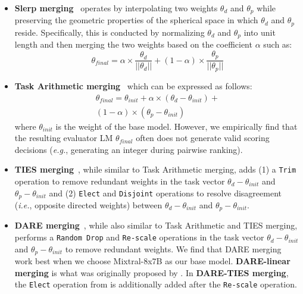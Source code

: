 \documentclass[11pt]{article}
\begin{document}
\begin{itemize}
    \item \textbf{Slerp merging}~\citep{goddard2024arcee} operates by interpolating two weights ${\theta}_{d}$ and ${\theta}_{p}$ while preserving the geometric properties of the spherical space in which ${\theta}_{d}$ and ${\theta}_{p}$ reside. Specifically, this is conducted by normalizing ${\theta}_{d}$ and ${\theta}_{p}$ into unit length and then merging the two weights based on the coefficient $\alpha$ such as: 
    \begin{equation}
    {\theta}_{final} = \alpha \times \frac{{\theta}_{d}}{||{\theta}_{d}||} + (1 - \alpha) \times \frac{{\theta}_{p}}{||{\theta}_{p}||}
\end{equation}
    \item \textbf{Task Arithmetic merging}~\citep{ilharco2022editing} which can be expressed as follows:
    \begin{equation}
\begin{aligned}
    {\theta}_{final} = {\theta}_{init} + \alpha \times ({\theta}_{d} - {\theta}_{init}) +\\ (1 - \alpha) \times ({\theta}_{p} - {\theta}_{init})
\end{aligned}
\end{equation}
where ${\theta}_{init}$ is the weight of the base model. However, we empirically find that the resulting evaluator LM ${\theta}_{final}$ often does not generate valid scoring decisions (\textit{e.g.}, generating an integer during pairwise ranking).
    \item \textbf{TIES merging}~\citep{yadav2024ties}, while similar to Task Arithmetic merging, adds (1) a \texttt{Trim} operation to remove redundant weights in the task vector ${\theta}_{d} - {\theta}_{init}$ and ${\theta}_{p} - {\theta}_{init}$ and (2) \texttt{Elect} and \texttt{Disjoint} operations to resolve disagreement (\textit{i.e.}, opposite directed weights) between ${\theta}_{d} - {\theta}_{init}$ and ${\theta}_{p} - {\theta}_{init}$.
    \item \textbf{DARE merging}~\citep{yu2023language}, while also similar to Task Arithmetic and TIES merging, performs a \texttt{Random Drop} and \texttt{Re-scale} operations in the task vector ${\theta}_{d} - {\theta}_{init}$ and ${\theta}_{p} - {\theta}_{init}$ to remove redundant weights. We find that DARE merging work best when we choose Mixtral-8x7B as our base model. \textbf{DARE-linear merging} is what was originally proposed by \citet{yu2023language}. In \textbf{DARE-TIES merging}, the \texttt{Elect} operation from \citet{yadav2024ties} is additionally added after the \texttt{Re-scale} operation.
\end{itemize}
\end{document}
